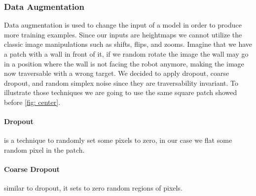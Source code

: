 \documentclass[../document.tex]{subfiles}
\begin{document}
\subsubsection{Data Augmentation}
\label{sec: data-aug}
Data augmentation is used to change the input of a model in order to produce more training examples. Since our inputs are heightmaps we cannot utilize the classic image manipulations such as shifts, flips, and zooms. Imagine that we have a patch with a wall in front of it, if we random rotate the image the wall may go in a position where the wall is not facing the robot anymore, making the image now traversable with a wrong target. We decided to apply dropout, coarse dropout, and random simplex noise since they are traversability invariant. To illustrate those techniques we are going to use the same square patch showed before \ref{fig: center}.

\paragraph{Dropout} is a technique to randomly set some pixels to zero, in our case we flat some random pixel in the patch. 
\paragraph{Coarse Dropout} similar to dropout, it sets to zero random regions of pixels.
\end{document}
